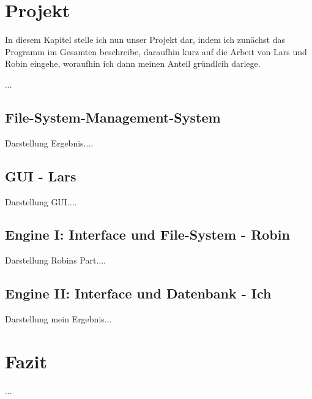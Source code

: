 \documentclass[12pt,a4paper,bibliography=totocnumbered,listof=totocnumbered]{scrartcl}
\begin{document}
\section{Projekt}
In diesem Kapitel stelle ich nun unser Projekt dar, indem ich zunächst das Programm im Gesamten beschreibe, daraufhin kurz auf die Arbeit von Lars und Robin eingehe, woraufhin ich dann meinen Anteil gründlcih darlege.


...

\subsection{File-System-Management-System}
Darstellung Ergebnis....

\subsection{GUI - Lars}
Darstellung GUI....

\subsection{Engine I: Interface und File-System - Robin}
Darstellung Robins Part....

\subsection{Engine II: Interface und Datenbank - Ich}
Darstellung mein Ergebnis...
\pagebreak
\section{Fazit}
...
\pagebreak


\begin{thebibliography}{9}

\end{thebibliography}
%
%
\pagebreak
\end{document}
